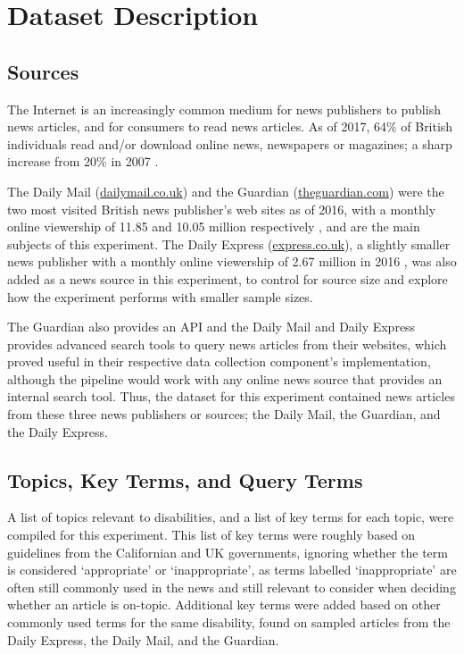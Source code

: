 \documentclass{report}
\begin{document}
\section{Dataset Description} \label{Dataset Description}  %

\subsection{Sources} \label{sources}

The Internet is an increasingly common medium for news publishers to publish news articles, and for consumers to read news articles.
As of 2017, 64\% of British individuals read and/or download online news, newspapers or magazines; a sharp increase from 20\% in 2007 \cite{statista2018share}. 

The Daily Mail (\url{dailymail.co.uk}) and the Guardian (\url{theguardian.com}) were the two most visited British news publisher's web sites as of 2016, with a monthly online viewership of 11.85 and 10.05 million respectively \cite{statista2018newspaper}, and are the main subjects of this experiment.
The Daily Express (\url{express.co.uk}), a slightly smaller news publisher with a monthly online viewership of 2.67 million in 2016 \cite{statista2018newspaper}, was also added as a news source in this experiment, to control for source size and explore how the experiment performs with smaller sample sizes.

The Guardian also provides an API \cite{guardian} and the Daily Mail and Daily Express provides advanced search tools \cite{daily-mail, daily-express} to query news articles from their websites, which proved useful in their respective data collection component's implementation, although the pipeline would work with any online news source that provides an internal search tool.
Thus, the dataset for this experiment contained news articles from these three news publishers or sources; the Daily Mail, the Guardian, and the Daily Express.

\subsection{Topics, Key Terms, and Query Terms} \label{topics}

A list of topics relevant to disabilities, and a list of key terms for each topic, were compiled for this experiment.
This list of key terms were roughly based on guidelines from the Californian \cite{ca-guideline} and UK \cite{uk-guideline} governments, ignoring whether the term is considered `appropriate' or `inappropriate', as terms labelled `inappropriate' are often still commonly used in the news and still relevant to consider when deciding whether an article is on-topic. 
Additional key terms were added based on other commonly used terms for the same disability, found on sampled articles from the Daily Express, the Daily Mail, and the Guardian.
\end{document}
